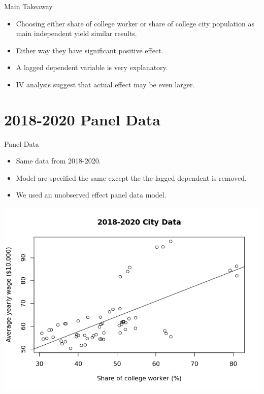 \documentclass[compress]{beamer}
\begin{document}
\begin{frame}{Main Takeaway}
  \begin{itemize}
    \item Choosing either share of college worker or share of college city population as main independent yield similar results.
    \item Either way they have significant positive effect.
    \item A lagged dependent variable is very explanatory.  
    \item IV analysis suggest that actual effect may be even larger.
  \end{itemize}
\end{frame}

\section[Panel Data]{2018-2020 Panel Data}
\begin{frame}{Panel Data}
  \begin{itemize}
    \item Same data from 2018-2020.
    \item Model are specified the same except the the lagged dependent is removed.
    \item We used an unobserved effect panel data model.
  \end{itemize}
  \begin{center}
    \includegraphics[height=0.5\textheight]{unnamed-chunk-33-1.png}
  \end{center}
  
\end{frame}
\end{document}
